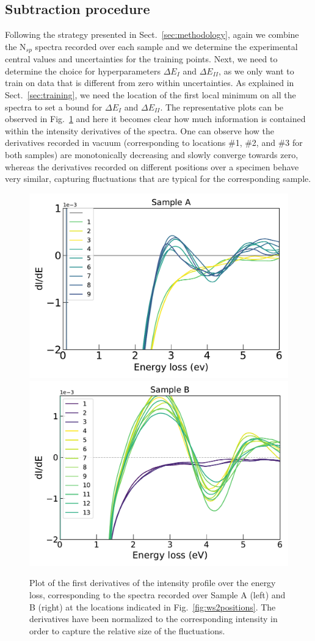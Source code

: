\subsection{Subtraction procedure}

Following the strategy presented in Sect.~\ref{sec:methodology}, again we combine
the N$_{sp}$ spectra recorded over each sample and we determine the 
experimental central values and uncertainties for the training points.
%
Next, we need to determine the choice for hyperparameters $\Delta E_I$ and $\Delta E_{II}$,
as we only want to train on data that is different from zero within uncertainties.
%
As explained in Sect.~\ref{sec:training}, we need the location of the first local minimum
on all the spectra to set a bound for $\Delta E_I$ and $\Delta E_{II}$. 
%
The representative plots can be observed in Fig.~\ref{fig:derivatives} and here it becomes
clear how much information is contained within the intensity derivatives of the spectra.
%
One can observe how the derivatives recorded in vacuum (corresponding to locations
\#1, \#2, and \#3 for both samples) are monotonically decreasing and slowly converge towards zero, whereas
the derivatives recorded on different positions over a specimen behave very similar, capturing fluctuations
that are typical for the corresponding sample.

\begin{figure}[H]
\begin{centering}
  \includegraphics[width=0.49\linewidth]{plots/Derivatives_sample_A.pdf}
  \includegraphics[width=0.49\linewidth]{plots/Derivatives_sample_B.pdf}
  \caption{Plot of the first derivatives of the intensity profile over the energy loss, 
  corresponding to the spectra
  recorded over Sample A (left) and B (right) at the locations
  indicated in Fig.~\ref{fig:ws2positions}.
  The derivatives have been normalized to the corresponding intensity in order to 
  capture the relative size of the fluctuations.
  }
\label{fig:derivatives}
\end{centering}
\end{figure}

